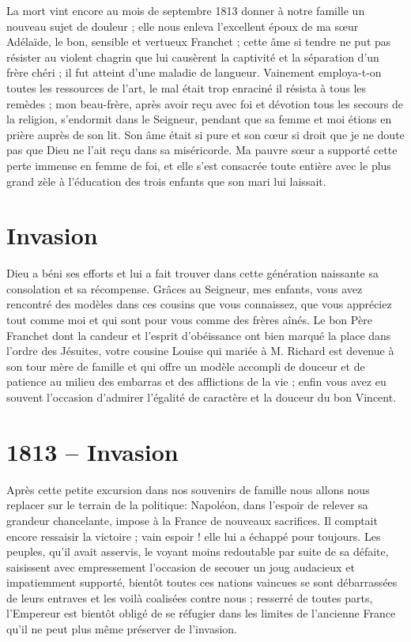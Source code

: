 \documentclass[11pt,a4paper]{report}
\begin{document}
La mort vint encore au mois de septembre 1813 donner à notre famille un nouveau sujet de douleur ; elle nous enleva l'excellent époux de ma sœur Adélaïde, le bon, sensible et vertueux Franchet ; cette âme si tendre ne put pas résister au violent chagrin que lui causèrent la captivité et la séparation d'un frère chéri ; il fut atteint d'une maladie de langueur. Vainement employa-t-on toutes les ressources de l'art, le mal était trop enraciné il résista à tous les remèdes ; mon beau-frère, après avoir reçu avec foi et dévotion tous les secours de la religion, s'endormit dans le Seigneur, pendant que sa femme et moi étions en prière auprès de son lit. Son âme était si pure et son cœur si droit que je ne doute pas que Dieu ne l'ait reçu dans sa miséricorde. Ma pauvre sœur a supporté cette perte immense en femme de foi, et elle s'est consacrée toute entière avec le plus grand zèle à l'éducation des trois enfants que son mari lui laissait.

\section*{Invasion}

Dieu a béni ses efforts et lui a fait trouver dans cette génération naissante sa consolation et sa récompense. Grâces au Seigneur, mes enfants, vous avez rencontré des modèles dans ces cousins que vous connaissez, que vous appréciez tout comme moi et qui sont pour vous comme des frères aînés. Le bon Père Franchet dont la candeur et l'esprit d'obéissance ont bien marqué la place dans l'ordre des Jésuites, votre cousine Louise qui mariée à M. Richard est devenue à son tour mère de famille et qui offre un modèle accompli de douceur et de patience au milieu des embarras et des afflictions de la vie ; enfin vous avez eu souvent l'occasion d'admirer l'égalité de caractère et la douceur du bon Vincent.

\section*{1813 -- Invasion}

Après cette petite excursion dans nos souvenirs de famille nous allons nous replacer sur le terrain de la politique: Napoléon, dans l'espoir de relever sa grandeur chancelante, impose à la France de nouveaux sacrifices. Il comptait encore ressaisir la victoire ; vain espoir ! elle lui a échappé pour toujours. Les peuples, qu'il avait asservis, le voyant moins redoutable par suite de sa défaite, saisissent avec empressement l'occasion de secouer un joug audacieux et impatiemment supporté, bientôt toutes ces nations vaincues se sont débarrassées de leurs entraves et les voilà coalisées contre nous ; resserré de toutes parts, l'Empereur est bientôt obligé de se réfugier dans les limites de l'ancienne France qu'il ne peut plus même préserver de l'invasion.
\end{document}
